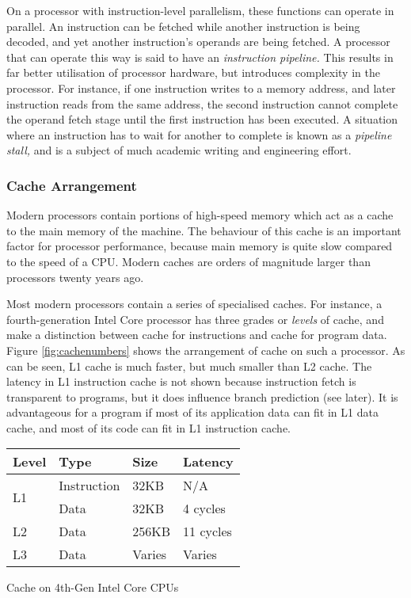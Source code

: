 			On a processor with instruction-level parallelism, these functions can operate in parallel. An instruction can be fetched while another instruction is being decoded, and yet another instruction's operands are being fetched. A processor that can operate this way is said to have an \emph{instruction pipeline.} This results in far better utilisation of processor hardware, but introduces complexity in the processor. For instance, if one instruction writes to a memory address, and later instruction reads from the same address, the second instruction cannot complete the operand fetch stage until the first instruction has been executed. A situation where an instruction has to wait for another to complete is known as a \emph{pipeline stall,} and is a subject of much academic writing and engineering effort.
			
			\subsubsection{Cache Arrangement}
			Modern processors contain portions of high-speed memory which act as a cache to the main memory of the machine. The behaviour of this cache is an important factor for processor performance, because main memory is quite slow compared to the speed of a CPU. Modern caches are orders of magnitude larger than processors twenty years ago. 
			
			Most modern processors contain a series of specialised caches. For instance, a fourth-generation Intel Core processor has three grades or \emph{levels} of cache, and make a distinction between cache for instructions and cache for program data. Figure \ref{fig:cachenumbers} shows the arrangement of cache on such a processor. As can be seen, L1 cache is much faster, but much smaller than L2 cache. The latency in L1 instruction cache is not shown because instruction fetch is transparent to programs, but it does influence branch prediction (see later). It is advantageous for a program if most of its application data can fit in L1 data cache, and most of its code can fit in L1 instruction cache. 
			
			\begin{myfigure}
				\begin{tabular}{ | l | l | l | l | }
					\hline
					Level & Type & Size & Latency \\ 
					\hline
					\multirow{2}{*}{L1} & Instruction & 32KB & N/A \\
					& Data & 32KB & 4 cycles \\
					\hline
					L2 & Data & 256KB & 11 cycles \\
					\hline
					L3 & Data & Varies & Varies \\
					\hline
				\end{tabular}
				\caption{Cache on 4th-Gen Intel Core CPUs \citep{optimisationreference}}
				\label{fig:cachenumbers}
			\end{myfigure}
			
